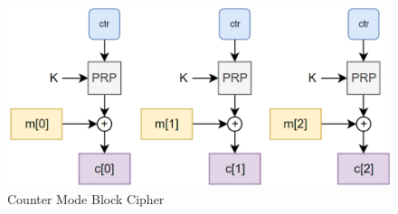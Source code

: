 \begin{figure}[H]
    \centering
    \includegraphics[width=\linewidth]{image/blkctr.png}
    \caption{Counter Mode Block Cipher}
    \label{fig:ctrmode}
\end{figure}

